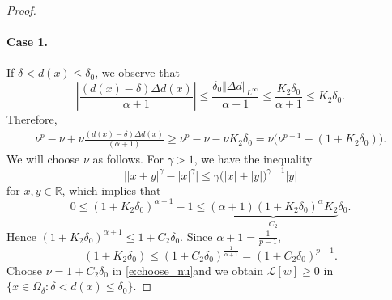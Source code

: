 \documentclass[11pt,reqno]{amsart}
\numberwithin{figure}{section}
\theoremstyle{plain}
\theoremstyle{remark}
\numberwithin{equation}{section}
\begin{document}
\begin{proof}
\paragraph{\textbf{Case 1.}} If $\delta< d(x)\leq \delta_0$, we observe that
\begin{equation*}
    \left|\frac{(d(x)-\delta)\Delta d(x)}{\alpha+1}\right| \leq \frac{\delta_0\Vert \Delta d\Vert_{L^\infty}}{\alpha+1} \leq \frac{K_2\delta_0}{\alpha+1}\leq K_2\delta_0.
\end{equation*}
Therefore,
\begin{equation}\label{e:choose_nu}
    \begin{split}
        \nu^p-\nu +\nu\frac{(d(x)-\delta)\Delta d(x)}{(\alpha+1)} \geq \nu^p - \nu - \nu K_2\delta_0 = \nu\Big(\nu^{p-1} - (1+K_2\delta_0)\Big).
    \end{split}
\end{equation}
We will choose $\nu$ as follows. For $\gamma>1$, we have the inequality
\begin{equation}\label{e:ineq}
    \Big||x+y|^\gamma - |x|^\gamma\Big|\leq \gamma\Big(|x|+|y|\Big)^{\gamma-1}|y|
\end{equation}
for $x,y\in \mathbb{R}$, which implies that
\begin{equation*}
     0 \leq (1+K_2\delta_0)^{\alpha+1} - 1 \leq\underbrace{(\alpha+1)\left(1+K_2\delta_0\right)^\alpha K_2}_{C_2}\delta_0.
\end{equation*}
Hence $(1+K_2\delta_0)^{\alpha+1} \leq 1 + C_2\delta_0$. Since $\alpha+1 = \frac{1}{p-1}$,
\begin{equation}\label{e:cru1}
    (1+K_2\delta_0) \leq (1+C_2\delta_0)^{\frac{1}{\alpha+1}} = (1+C_2\delta_0)^{p-1}. 
\end{equation}
Choose $\nu = 1+C_2\delta_0$ in \eqref{e:choose_nu}and we obtain $\mathcal{L}[w]\geq 0$ in $\{x\in \Omega_\delta: \delta <d(x)\leq \delta_0\}$. 


\end{proof}
\end{document}
